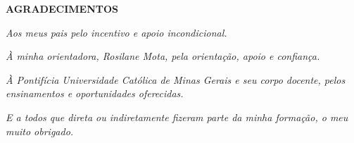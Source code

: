 \begin{center}
	\normalsize
	\textbf{AGRADECIMENTOS}
\end{center}

\textit{Aos meus pais pelo incentivo e apoio incondicional.}
  
\textit{À minha orientadora, Rosilane Mota, pela orientação, apoio e confiança.}
  
\textit{À Pontifícia Universidade Católica de Minas Gerais e seu corpo docente, pelos ensinamentos e oportunidades oferecidas.}

\textit{E a todos que direta ou indiretamente fizeram parte da minha formação, o meu muito obrigado.}